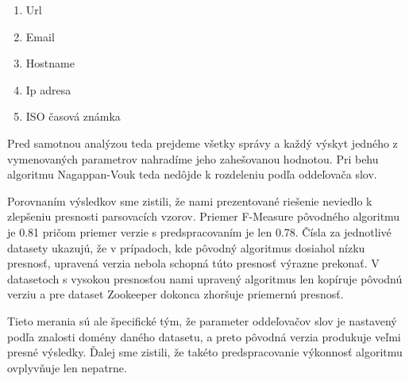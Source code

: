 \begin{enumerate}
  \item Url
  \item Email
  \item Hostname
  \item Ip adresa
  \item ISO časová známka
\end{enumerate}

Pred samotnou analýzou teda prejdeme všetky správy a každý výskyt jedného z vymenovaných parametrov nahradíme jeho zahešovanou hodnotou. Pri behu algoritmu Nagappan-Vouk teda nedôjde k rozdeleniu podľa oddeľovača slov. 
\par Porovnaním výsledkov sme zistili, že nami prezentované riešenie neviedlo k zlepšeniu presnosti parsovacích vzorov. Priemer F-Measure pôvodného algoritmu je 0.81 pričom priemer verzie s predspracovaním je len 0.78. Čísla za jednotlivé datasety ukazujú, že v prípadoch, kde pôvodný algoritmus dosiahol nízku presnosť, upravená verzia nebola schopná túto presnosť výrazne prekonať. V datasetoch s vysokou presnosťou nami upravený algoritmus len kopíruje pôvodnú verziu a pre dataset Zookeeper dokonca zhoršuje priemernú presnosť. 
\par Tieto merania sú ale špecifické tým, že parameter oddeľovačov slov je nastavený podľa znalosti domény daného datasetu, a preto pôvodná verzia produkuje veľmi presné výsledky. Ďalej sme zistili, že takéto predspracovanie výkonnosť algoritmu ovplyvňuje len nepatrne.